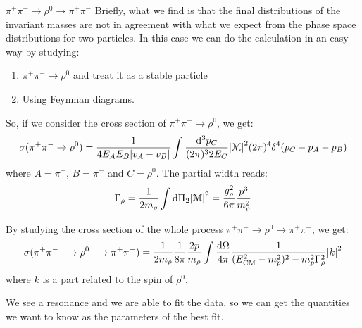 \documentclass[../../main/main.tex]{subfiles}
\begin{document}
\begin{example}{\( \pi^+\pi^- \longrightarrow \rho^0 \longrightarrow \pi^+\pi^- \)}{}
    Briefly, what we find is that the final distributions of the invariant masses are not in agreement with what we expect from the phase space distributions for two particles. In this case we can do the calculation in an easy way by studying:
    \begin{enumerate}
        \item \( \pi^+\pi^- \longrightarrow \rho^0 \) and treat it as a stable particle
        \item Using Feynman diagrams.
    \end{enumerate}
	So, if we consider the cross section of \( \pi^+\pi^- \longrightarrow \rho^0 \), we get:
    \begin{equation}
        \sigma(\pi^+\pi^- \rightarrow \rho^0)
        =
        \frac{1}{4 E_A E_B \abs{v_A - v_B}} \int_{}^{} \frac{\mathrm{d}{^3p_C}}{(2\pi)^3 2 E_C} \abs{\mathcal{M}}^2 (2 \pi)^4 \delta^4(p_C - p_A - p_B)
        \label{eq:L03_PPRPPCS}
    \end{equation}
    where \( A = \pi^+ \), \( B = \pi^- \) and \( C = \rho^0 \). The partial width reads:
    \begin{equation}
        \Gamma_{\rho}
        =
        \frac{1}{2 m_{\rho}} \int_{}^{} \mathrm{d}{\Pi_2} \abs{\mathcal{M}}^2
		=
		\frac{g_{\rho}^2}{6\pi} \frac{p^3}{m_{\rho}^2}
        \label{eq:L03_RPW}
    \end{equation}

	By studying the cross section of the whole process \( \pi^+\pi^- \longrightarrow \rho^0 \longrightarrow \pi^+\pi^- \), we get:
    \begin{equation}
        \sigma(\pi^+\pi^- \longrightarrow \rho^0 \longrightarrow \pi^+\pi^-)
        =
        \frac{1}{2m_{\rho}} \frac{1}{8\pi} \frac{2p}{m_{\rho}} \int_{}^{} \frac{\mathrm{d}{\Omega}}{4\pi} \frac{1}{(E^2_\mathrm{CM} - m^2_p)^2 - m^2_p \Gamma^2_{\rho}} \abs{k}^2
        \label{eq:}
    \end{equation}
    where \( k \) is a part related to the spin of \( \rho^0 \).

    We see a resonance and we are able to fit the data, so we can get the quantities we want to know as the parameters of the best fit.
\end{example}
\end{document}
